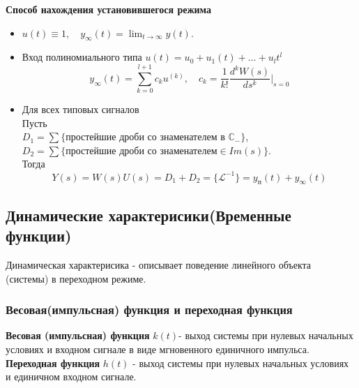 \documentclass[A4]{article}
\begin{document}
\textbf{Способ нахождения установившегося режима}
\begin{itemize}
	\item $u(t)\equiv 1,\quad y_{\infty}(t)=\lim_{t\rightarrow\infty}y(t)$.
	\item Вход полиномиального типа $u(t)=u_0+u_1(t)+\ldots+u_lt^l$\\
	\begin{equation*}
	y_{\infty}(t)=\sum_{k=0}^{l+1}c_ku^{(k)},\quad c_k=\frac{1}{k!}\frac{d^kW(s)}{ds^k}\bigg|_{s=0}
	\end{equation*}
	\item Для всех типовых сигналов\\
	Пусть\\
	$D_1 = \sum \{\text{простейшие дроби со знаменателем в } \mathbb{C}_{-}\}$,\\
	$D_2=\sum \{\text{простейшие дроби со знаменателем} \in Im(s)\}$.\\
	Тогда
	\begin{equation}
	Y(s)=W(s)U(s)=D_1+D_2=\{\mathcal{L}^{-1}\}= y_{\text{п}}(t)+y_{\infty}(t)
	\end{equation}
\end{itemize}

\subsection{Динамические характерисики(Временные функции)}
Динамическая характерисика - описывает поведение линейного объекта (системы) в переходном режиме.
\subsubsection{Весовая(импульсная) функция и переходная функция}
\textbf{Весовая (импульсная) функция} $k(t)$- выход системы при нулевых начальных условиях и входном сигнале в виде мгновенного единичного импульса.\\
\textbf{Переходная функция} $h(t)$ - выход системы при нулевых начальных условиях и единичном входном сигнале.\\
\end{document}
